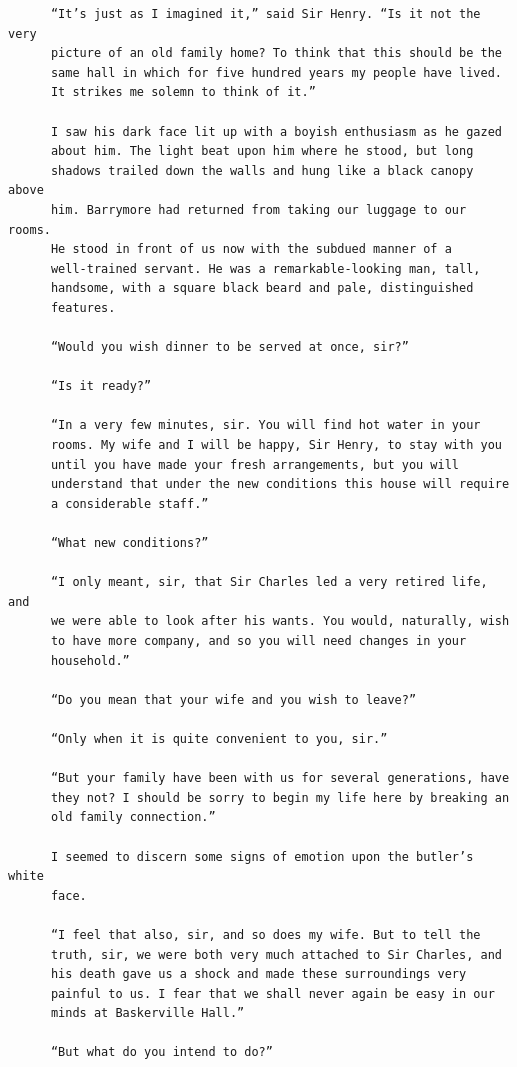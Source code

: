 \documentclass{article}
\begin{document}
\begin{verbatim}
      “It’s just as I imagined it,” said Sir Henry. “Is it not the very
      picture of an old family home? To think that this should be the
      same hall in which for five hundred years my people have lived.
      It strikes me solemn to think of it.”

      I saw his dark face lit up with a boyish enthusiasm as he gazed
      about him. The light beat upon him where he stood, but long
      shadows trailed down the walls and hung like a black canopy above
      him. Barrymore had returned from taking our luggage to our rooms.
      He stood in front of us now with the subdued manner of a
      well-trained servant. He was a remarkable-looking man, tall,
      handsome, with a square black beard and pale, distinguished
      features.

      “Would you wish dinner to be served at once, sir?”

      “Is it ready?”

      “In a very few minutes, sir. You will find hot water in your
      rooms. My wife and I will be happy, Sir Henry, to stay with you
      until you have made your fresh arrangements, but you will
      understand that under the new conditions this house will require
      a considerable staff.”

      “What new conditions?”

      “I only meant, sir, that Sir Charles led a very retired life, and
      we were able to look after his wants. You would, naturally, wish
      to have more company, and so you will need changes in your
      household.”

      “Do you mean that your wife and you wish to leave?”

      “Only when it is quite convenient to you, sir.”

      “But your family have been with us for several generations, have
      they not? I should be sorry to begin my life here by breaking an
      old family connection.”

      I seemed to discern some signs of emotion upon the butler’s white
      face.

      “I feel that also, sir, and so does my wife. But to tell the
      truth, sir, we were both very much attached to Sir Charles, and
      his death gave us a shock and made these surroundings very
      painful to us. I fear that we shall never again be easy in our
      minds at Baskerville Hall.”

      “But what do you intend to do?”


\end{verbatim}
\end{document}
